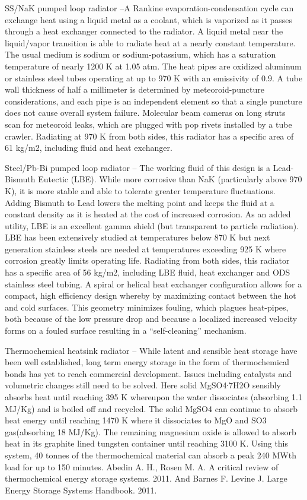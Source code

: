 \documentclass[a4paper]{book}
\begin{document}
SS/NaK pumped loop radiator –A Rankine evaporation-condensation cycle can exchange heat using a liquid metal as a coolant, which is vaporized as it passes through a heat exchanger connected to the radiator. A liquid metal near the liquid/vapor transition is able to radiate heat at a nearly constant temperature. The usual medium is sodium or sodium-potassium, which has a saturation temperature of nearly 1200 K at 1.05 atm.  The heat pipes are oxidized aluminum or stainless steel tubes operating at up to 970 K with an emissivity of 0.9. A tube wall thickness of half a millimeter is determined by meteoroid-puncture considerations, and each pipe is an independent element so that a single puncture does not cause overall system failure.  Molecular beam cameras on long struts scan for meteoroid leaks, which are plugged with pop rivets installed by a tube crawler. Radiating at 970 K from both sides, this radiator has a specific area of 61 kg/m2, including fluid and heat exchanger. 
 
Steel/Pb-Bi pumped loop radiator – The working fluid of this design is a Lead-Bismuth Eutectic (LBE). While more corrosive than NaK (particularly above 970 K), it is more stable and able to tolerate greater temperature fluctuations.  Adding Bismuth to Lead lowers the melting point and keeps the fluid at a constant density as it is heated at the cost of increased corrosion. As an added utility, LBE is an excellent gamma shield (but transparent to particle radiation).  LBE has been extensively studied at temperatures below 870 K but next generation stainless steels are needed at temperatures exceeding 925 K where corrosion greatly limits operating life.   Radiating from both sides, this radiator has a specific area of 56 kg/m2, including LBE fluid, heat exchanger and ODS stainless steel tubing. A spiral or helical heat exchanger configuration allows for a compact, high efficiency design whereby by maximizing contact between the hot and cold surfaces. This geometry minimizes fouling, which plagues heat-pipes, both because of the low pressure drop and because a localized increased velocity forms on a fouled surface resulting in a “self-cleaning” mechanism.
 
Thermochemical heatsink radiator – While latent and sensible heat storage have been well established, long term energy storage in the form of thermochemical bonds has yet to reach commercial development.  Issues including catalysts and volumetric changes still need to be solved.  Here solid MgSO4∙7H2O sensibly absorbs heat until reaching 395 K whereupon the water dissociates (absorbing 1.1 MJ/Kg) and is boiled off and recycled. The solid MgSO4 can continue to absorb heat energy until reaching 1470 K where it dissociates to MgO and SO3 gas(absorbing 18 MJ/Kg).  The remaining magnesium oxide is allowed to absorb heat in its graphite lined tungsten container until reaching 3100 K.  Using this system, 40 tonnes of the thermochemical material can absorb a peak 240 MWth load for up to 150 minutes.  Abedin A. H., Rosen M. A. A critical review of thermochemical energy storage systems. 2011. And Barnes F. Levine J. Large Energy Storage Systems Handbook. 2011.
 
\end{document}
